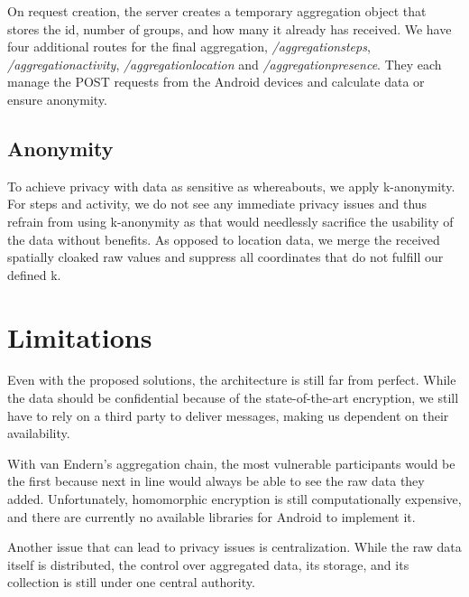 On request creation, the server creates a temporary aggregation object that stores the id, number of groups, and how many it already has received. We have four additional routes for the final aggregation, \textit{/aggregationsteps}, \textit{/aggregationactivity}, \textit{/aggregationlocation} and \textit{/aggregationpresence}. They each manage the POST requests from the Android devices and calculate data or ensure anonymity.

\subsection{Anonymity}
To achieve privacy with data as sensitive as whereabouts, we apply k-anonymity. For steps and activity, we do not see any immediate privacy issues and thus refrain from using k-anonymity as that would needlessly sacrifice the usability of the data without benefits. As opposed to location data, we merge the received spatially cloaked raw values and suppress all coordinates that do not fulfill our defined k. 

\section{Limitations}
Even with the proposed solutions, the architecture is still far from perfect. While the data should be confidential because of the state-of-the-art encryption, we still have to rely on a third party to deliver messages, making us dependent on their availability.

With van Endern's aggregation chain, the most vulnerable participants would be the first because next in line would always be able to see the raw data they added. Unfortunately, homomorphic encryption is still computationally expensive, and there are currently no available libraries for Android to implement it.

Another issue that can lead to privacy issues is centralization. While the raw data itself is distributed, the control over aggregated data, its storage, and its collection is still under one central authority.